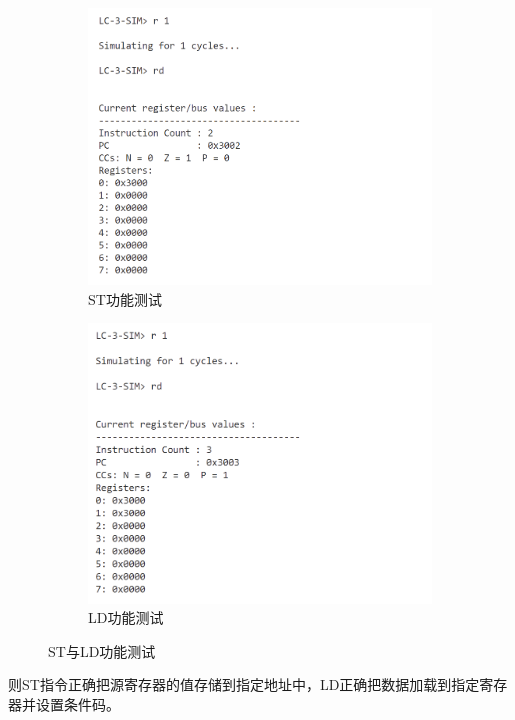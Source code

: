 \documentclass[UTF8]{ctexart}
\begin{document}
\begin{figure}[htbp]
  \centering
  \begin{subfigure}{0.48\textwidth} %
    \includegraphics[width=\linewidth]{st.png}
    \caption{ST功能测试}
  \end{subfigure}
  \hfill
  \begin{subfigure}{0.48\textwidth}
    \includegraphics[width=\linewidth]{ld.png}
    \caption{LD功能测试}
  \end{subfigure}
  \caption{ST与LD功能测试}
  \label{stld}
\end{figure}
则ST指令正确把源寄存器的值存储到指定地址中，LD正确把数据加载到指定寄存器并设置条件码。
\end{document}
